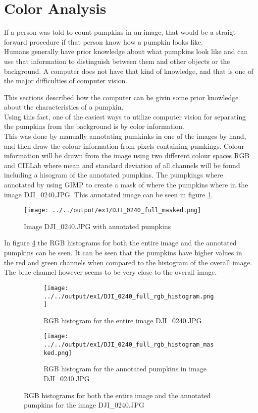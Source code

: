 \documentclass[../Head/Main.tex]{subfiles}
\begin{document}
\section{Color Analysis}
\label{sec:colorAnalysis}

If a person was told to count pumpkins in an image, that would be a straigt forward procedure if that person know how a pumpkin looks like.\\
Humans generally have prior knowledge about what pumpkins look like and can use that information to distinguish between them and other objects or the background.
A computer does not have that kind of knowledge, and that is one of the major difficulties of computer vision.\par
This sections described how the computer can be givin some prior knowledge about the characteristics of a pumpkin.\\
Using this fact, one of the easiest ways to utilize computer vision for separating the pumpkins from the background is by color information.\\
This was done by manually annotating pumkinks in one of the images by hand, and then draw the colour information from pixels containing pumkings. Colour information will be drawn from the image using two different colour spaces RGB and CIELab where mean and standard deviation of all channels will be found including a hisogram of the annotated pumpkins. The pumpkings where annotated by using GIMP to create a mask of where the pumpkins where in the image DJI\_0240.JPG. This annotated image can be seen in figure \ref{fig:ann_pump}.
\begin{figure}[H]
	\centering
	\texttt{[image: ../../output/ex1/DJI\_0240\_full\_masked.png]}
	\caption{Image DJI\_0240.JPG with annotated pumpkins}
	\label{fig:ann_pump}
\end{figure}

In figure \ref{fig:rgb_hist} the RGB histograms for both the entire image and the annotated pumpkins can be seen. It can be seen that the pumpkins have higher values in the red and green channels when compared to the histogram of the overall image. The blue channel however seems to be very close to the overall image.
\begin{figure}[H]
	\centering
	\begin{subfigure}{0.49\textwidth}
		\centering
		\texttt{[image: ../../output/ex1/DJI\_0240\_full\_rgb\_histogram.png]}
		\caption{RGB histogram for the entire image DJI\_0240.JPG}
		\label{fig:rgb_hist_full}	
	\end{subfigure}
	\begin{subfigure}{0.49\textwidth}
		\centering
		\texttt{[image: ../../output/ex1/DJI\_0240\_full\_rgb\_histogram\_masked.png]}
		\caption{RGB histogram for the annotated pumpkins in image DJI\_0240.JPG}
		\label{fig:rgb_hist_masked}
	\end{subfigure}
	\caption{RGB histograms for both the entire image and the annotated pumpkins for the image DJI\_0240.JPG}
	\label{fig:rgb_hist}
\end{figure}
\end{document}
